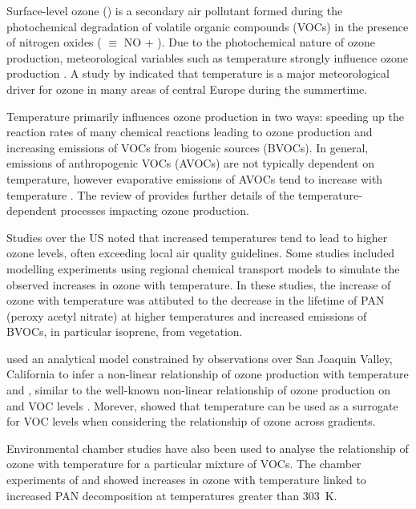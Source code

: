 Surface-level ozone () is a secondary air pollutant formed during the photochemical degradation of volatile organic compounds (VOCs) in the presence of nitrogen oxides ( $\equiv$ NO + ).
Due to the photochemical nature of ozone production, meteorological variables such as temperature strongly influence ozone production \citep{Jacob:2009}.
A study by \citet{Otero:2016} indicated that temperature is a major meteorological driver for ozone in many areas of central Europe during the summertime.

Temperature primarily influences ozone production in two ways: speeding up the reaction rates of many chemical reactions leading to ozone production and increasing emissions of VOCs from biogenic sources (BVOCs).
In general, emissions of anthropogenic VOCs (AVOCs) are not typically dependent on temperature, however evaporative emissions of AVOCs tend to increase with temperature \citep{Rubin:2006}.
The review of \citet{Pusede:2015} provides further details of the temperature-dependent processes impacting ozone production.

Studies over the US \citep{Sillman:1995a, Dawson:2007, Pusede:2014} noted that increased temperatures tend to lead to higher ozone levels, often exceeding local air quality guidelines.
Some studies \citep{Sillman:1995a, Dawson:2007} included modelling experiments using regional chemical transport models to simulate the observed increases in ozone with temperature.
In these studies, the increase of ozone with temperature was attibuted to the decrease in the lifetime of PAN (peroxy acetyl nitrate) at higher temperatures and increased emissions of BVOCs, in particular isoprene, from vegetation.

\citet{Pusede:2014} used an analytical model constrained by observations over San Joaquin Valley, California to infer a non-linear relationship of ozone production with temperature and , similar to the well-known non-linear relationship of ozone production on  and VOC levels \citep{Sillman:1999}.
Morever, \citet{Pusede:2014} showed that temperature can be used as a surrogate for VOC levels when considering the relationship of ozone across  gradients.

Environmental chamber studies have also been used to analyse the relationship of ozone with temperature for a particular mixture of VOCs.
The chamber experiments of \citet{Carter:1979} and \citet{Hatakeyama:1991} showed increases in ozone with temperature linked to increased PAN decomposition at temperatures greater than $303$~K.

